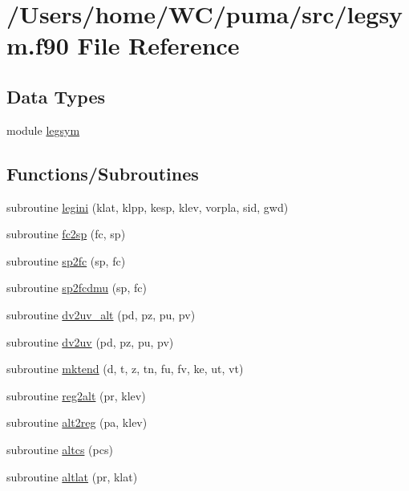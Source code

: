 \hypertarget{legsym_8f90}{
\section{/\-Users/home/\-W\-C/puma/src/legsym.f90 \-File \-Reference}
\label{legsym_8f90}
}
\subsection*{\-Data \-Types}
\begin{DoxyCompactItemize}
\item 
module \hyperlink{classlegsym}{legsym}
\end{DoxyCompactItemize}
\subsection*{\-Functions/\-Subroutines}
\begin{DoxyCompactItemize}
\item 
subroutine \hyperlink{legsym_8f90_a86bc436e65d6c4ddde72bb3cce7dc8c8}{legini} (klat, klpp, kesp, klev, vorpla, sid, gwd)
\item 
subroutine \hyperlink{legsym_8f90_a04d46a94caf6c743547ac25cfa3058d4}{fc2sp} (fc, sp)
\item 
subroutine \hyperlink{legsym_8f90_aec404fc15930c6e4584c088a399ea099}{sp2fc} (sp, fc)
\item 
subroutine \hyperlink{legsym_8f90_ac25a3c42ee19118b299203d2747cb59e}{sp2fcdmu} (sp, fc)
\item 
subroutine \hyperlink{legsym_8f90_a581747beee32c3386dfc0b9b1cfa4e0f}{dv2uv\-\_\-alt} (pd, pz, pu, pv)
\item 
subroutine \hyperlink{legsym_8f90_af9cbedf7e87d9d5b2360c204237cc698}{dv2uv} (pd, pz, pu, pv)
\item 
subroutine \hyperlink{legsym_8f90_ab97cf272bad63e9bdd87a01317bb71c9}{mktend} (d, t, z, tn, fu, fv, ke, ut, vt)
\item 
subroutine \hyperlink{legsym_8f90_a4a468562c0549b4ca3ec6ea34f87545a}{reg2alt} (pr, klev)
\item 
subroutine \hyperlink{legsym_8f90_a308819246e409c8dbe1e778d304ef415}{alt2reg} (pa, klev)
\item 
subroutine \hyperlink{legsym_8f90_a6ba5b0b99819bcbad73f2e2eb49c62bb}{altcs} (pcs)
\item 
subroutine \hyperlink{legsym_8f90_ae810767bcafdac840ab48c420efcb49a}{altlat} (pr, klat)
\end{DoxyCompactItemize}



